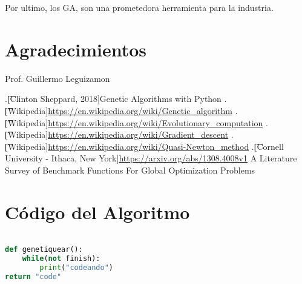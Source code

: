\documentclass[10pt]{article}
\begin{document}
Por ultimo, los GA, son una prometedora herramienta para la industria.

\section*{Agradecimientos}
Prof. Guillermo Leguizamon


\begin{thebibliography}{99} %
.\t[Clinton Sheppard, 2018]{}Genetic Algorithms with Python
.\t[Wikipedia]{}\url{https://en.wikipedia.org/wiki/Genetic_algorithm}
.\t[Wikipedia]{}\url{https://en.wikipedia.org/wiki/Evolutionary_computation}
.\t[Wikipedia]{}\url{https://en.wikipedia.org/wiki/Gradient_descent}
.\t[Wikipedia]{}\url{https://en.wikipedia.org/wiki/Quasi-Newton_method}
.\t[Cornell University - Ithaca, New York]{}\url{https://arxiv.org/abs/1308.4008v1} A Literature Survey of Benchmark Functions For Global Optimization Problems




\end{thebibliography} 
 
\section{Código del Algoritmo}
\begin{lstlisting}[language=Python]

def genetiquear():
	while(not finish):
		print("codeando")
return "code"

\end{lstlisting}
\newpage
\tableofcontents
\end{document}
